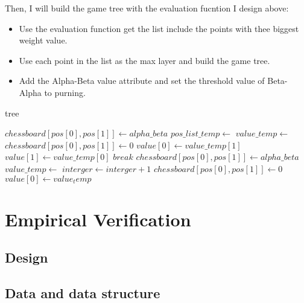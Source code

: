 \documentclass[conference,compsoc]{IEEEtran}
\begin{document}
  Then, I will build the game tree with the evaluation fucntion I design above:
  \begin{itemize}
    \item Use the evaluation function get the list include the points with thee biggest weight value.
    \item Use each point in the list as the max layer and build the game tree.
    \item Add the Alpha-Beta value attribute and set the threshold value of Beta-Alpha to purning.
  \end{itemize}
  \begin{algorithm}
    \caption{tree}
    \begin{algorithmic}[1]
      \State $ chessboard[pos[0],pos[1]] \gets alpha\_beta $
      \State $ pos\_list\_temp \gets$
      \State $ value\_temp\gets$
      \State $ chessboard[pos[0], pos[1]]\gets 0 $
              \State $ value[0]\gets value\_temp[1]$
              \EndIf
          \Else
              \State $ value[1]\gets value\_temp[0]$
              \EndIf
              \EndIf    
          \State $ break $
          \EndIf    
      \Else
      \State $ chessboard[pos[0], pos[1]]\gets alpha\_beta $
      \State $ value\_temp \gets$
      \State $ interger\gets interger + 1 $
      \State $ chessboard[pos[0], pos[1]]\gets 0 $
      \State $ value[0]\gets value_temp $
      \EndIf
    \EndFor
        \EndFunction
      \end{algorithmic}
  \end{algorithm}

\section{Empirical Verification}
\subsection{Design}

\subsection{Data and data structure}
\end{document}
